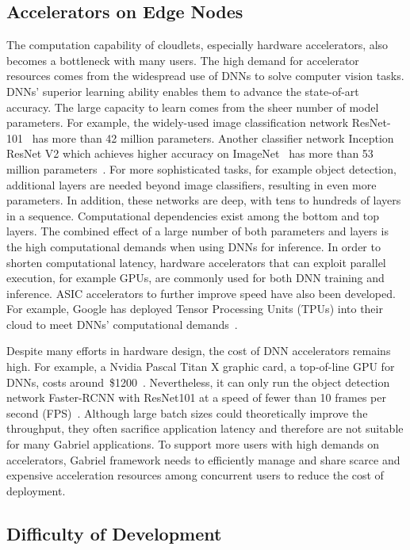 \subsection{Accelerators on Edge Nodes}
The computation capability of cloudlets, especially hardware accelerators, also
becomes a bottleneck with many users. The high demand for accelerator resources
comes from the widespread use of DNNs to solve computer vision tasks. DNNs'
superior learning ability enables them to advance the state-of-art accuracy. The
large capacity to learn comes from the sheer number of model parameters. For
example, the widely-used image classification network
ResNet-101~\cite{he2016deep} has more than 42 million parameters. Another
classifier network Inception ResNet V2 which achieves higher accuracy on
ImageNet~\cite{deng2009imagenet} has more than 53 million
parameters~\cite{huang2017speed}. For more sophisticated tasks, for example
object detection, additional layers are needed beyond image classifiers,
resulting in even more parameters. In addition, these networks are deep, with
tens to hundreds of layers in a sequence. Computational dependencies exist
among the bottom and top layers. The combined effect of a large number of both
parameters and layers is the high computational demands when using DNNs for
inference. In order to shorten computational latency, hardware accelerators that
can exploit parallel execution, for example GPUs, are commonly used for both
DNN training and inference. ASIC accelerators to further improve speed have also
been developed. For example, Google has deployed Tensor Processing Units (TPUs)
into their cloud to meet DNNs' computational
demands~\cite{jouppi2017datacenter}.

Despite many efforts in hardware design, the cost of DNN accelerators remains
high. For example, a Nvidia Pascal Titan X graphic card, a top-of-line GPU for
DNNs, costs around~\$1200~\cite{Nvidia2017TitanX}. Nevertheless, it can only run
the object detection network Faster-RCNN with ResNet101 at a speed of fewer than
10 frames per second (FPS)~\cite{huang2017speed}. Although large batch sizes
could theoretically improve the throughput, they often sacrifice application
latency and therefore are not suitable for many Gabriel applications. To support
more users with high demands on accelerators, Gabriel framework needs to
efficiently manage and share scarce and expensive acceleration resources among
concurrent users to reduce the cost of deployment.

\subsection{Difficulty of Development}

